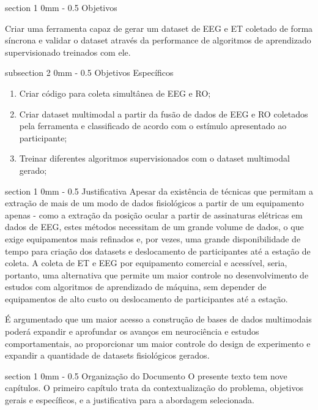 \documentclass[a4paper, 12pt]{ppgeb}
\makeatletter
\renewcommand{\section}{\@startsection
{section}
{1}
{0mm}
{-\baselineskip}
{0.5\baselineskip}
{\large\bfseries\scshape}}
\renewcommand{\subsection}{\@startsection
{subsection}
{2}
{0mm}
{-\baselineskip}
{0.5\baselineskip}
{\bf\sffamily}}
\makeatother
\begin{document}
\section{Objetivos}

Criar uma ferramenta capaz de gerar um dataset de EEG e ET coletado de forma síncrona e validar o dataset através da performance de algoritmos de aprendizado supervisionado treinados com ele.

\subsection{Objetivos Específicos}

\begin{enumerate}
    \item Criar código para coleta simultânea de EEG e RO;
    \item Criar dataset multimodal a partir da fusão de dados de EEG e RO coletados pela ferramenta e classificado de acordo com o estímulo apresentado ao participante;
    \item Treinar diferentes algoritmos supervisionados com o dataset multimodal gerado;
\end{enumerate}

\section{Justificativa}
Apesar da existência de técnicas que permitam a extração de mais de um modo de dados fisiológicos a partir de um equipamento apenas - como a extração da posição ocular a partir de assinaturas elétricas em dados de EEG, estes métodos necessitam de um grande volume de dados, o que exige equipamentos mais refinados e, por vezes, uma grande disponibilidade de tempo para criação dos datasets e deslocamento de participantes até a estação de coleta. A coleta de ET e EEG por equipamento comercial e acessível, seria, portanto, uma alternativa que permite um maior controle no desenvolvimento de estudos com algoritmos de aprendizado de máquina, sem depender de equipamentos de alto custo ou deslocamento de participantes até a estação. 


É argumentado que um maior acesso a construção de bases de dados multimodais poderá expandir e aprofundar os avanços em neurociência e estudos comportamentais, ao proporcionar um maior controle do design de experimento e expandir a quantidade de datasets fisiológicos gerados. 

\section{Organização do Documento}
O presente texto tem nove capítulos. O primeiro capítulo trata da contextualização do problema, objetivos gerais e específicos, e a justificativa para a abordagem selecionada. 
\end{document}
